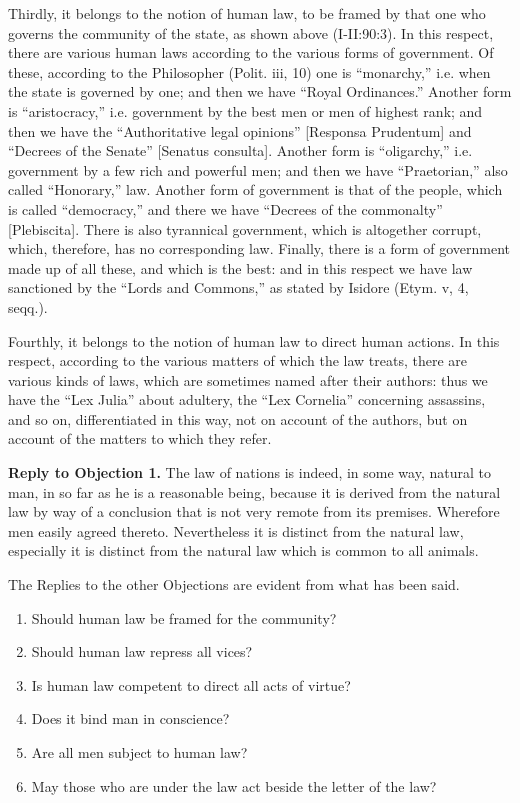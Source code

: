 Thirdly, it belongs to the notion of human law, to be framed by that one who governs the community of the state, as shown above (I-II:90:3). In this respect, there are various human laws according to the various forms of government. Of these, according to the Philosopher (Polit. iii, 10) one is ``monarchy,'' i.e. when the state is governed by one; and then we have ``Royal Ordinances.'' Another form is ``aristocracy,'' i.e. government by the best men or men of highest rank; and then we have the ``Authoritative legal opinions'' [Responsa Prudentum] and ``Decrees of the Senate'' [Senatus consulta]. Another form is ``oligarchy,'' i.e. government by a few rich and powerful men; and then we have ``Praetorian,'' also called ``Honorary,'' law. Another form of government is that of the people, which is called ``democracy,'' and there we have ``Decrees of the commonalty'' [Plebiscita]. There is also tyrannical government, which is altogether corrupt, which, therefore, has no corresponding law. Finally, there is a form of government made up of all these, and which is the best: and in this respect we have law sanctioned by the ``Lords and Commons,'' as stated by Isidore (Etym. v, 4, seqq.).

Fourthly, it belongs to the notion of human law to direct human actions. In this respect, according to the various matters of which the law treats, there are various kinds of laws, which are sometimes named after their authors: thus we have the ``Lex Julia'' about adultery, the ``Lex Cornelia'' concerning assassins, and so on, differentiated in this way, not on account of the authors, but on account of the matters to which they refer.

\textbf{Reply to Objection 1.} The law of nations is indeed, in some way, natural to man, in so far as he is a reasonable being, because it is derived from the natural law by way of a conclusion that is not very remote from its premises. Wherefore men easily agreed thereto. Nevertheless it is distinct from the natural law, especially it is distinct from the natural law which is common to all animals.

The Replies to the other Objections are evident from what has been said.


\begin{enumerate}

\item  Should human law be framed for the community? 
\item  Should human law repress all vices? 
\item  Is human law competent to direct all acts of virtue? 
\item  Does it bind man in conscience? 
\item  Are all men subject to human law? 
\item  May those who are under the law act beside the letter of the law? 
\end{enumerate}

